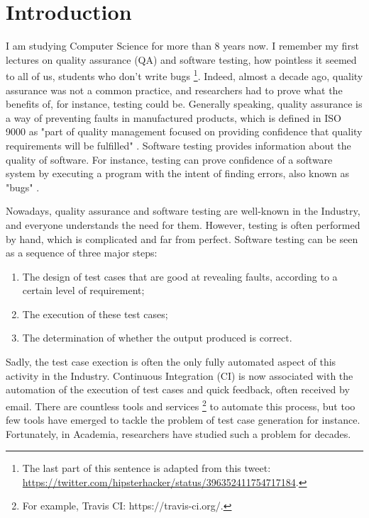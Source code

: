 %
\chapter{Introduction}
\label{sec:intro}

\minitoc

I am studying Computer Science for more than 8 years now. I
remember my first lectures on quality assurance (QA) and software
testing, how pointless it seemed to all of us, students who don't
write bugs \footnote{The last part of this sentence is adapted
from this tweet:
\url{https://twitter.com/hipsterhacker/status/396352411754717184}.}.
Indeed, almost a decade ago, quality assurance was not a common
practice, and researchers had to prove what the benefits of, for
instance, testing could be. Generally speaking, quality assurance
is a way of preventing faults in manufactured products, which is
defined in ISO 9000 as "part of quality management focused on
providing confidence that quality requirements will be fulfilled"
\cite{iso20059000}. Software testing provides information about
the quality of software. For instance, testing can prove
confidence of a software system by executing a program with the
intent of finding errors, also known as "bugs"
\cite{Myers:1979:AST:539883}.

Nowadays, quality assurance and software testing are well-known
in the Industry, and everyone understands the need for them.
However, testing is often performed by hand, which is complicated
and far from perfect. Software testing can be seen as a sequence
of three major steps:

\begin{enumerate}
    \item The design of test cases that are good at revealing
        faults, according to a certain level of requirement;

    \item The execution of these test cases;

    \item The determination of whether the output produced is
        correct.
\end{enumerate}

Sadly, the test case exection is often the only fully automated
aspect of this activity in the Industry. Continuous Integration
(CI) \cite{booch1991object} is now associated with the automation
of the execution of test cases and quick feedback, often received
by email. There are countless tools and services
\footnote{For example, Travis CI: https://travis-ci.org/.} to
automate this process, but too few tools have emerged to tackle
the problem of test case generation for instance. Fortunately, in
Academia, researchers have studied such a problem for decades.


